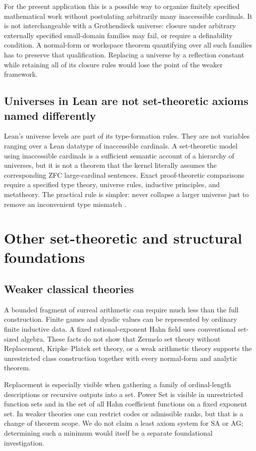 \documentclass[11pt,letterpaper]{article}
\theoremstyle{definition}
\theoremstyle{remark}
\numberwithin{equation}{section}
\begin{document}
For the present application this is a possible way to organize finitely specified mathematical work without postulating arbitrarily many inaccessible cardinals. It is not interchangeable with a Grothendieck universe: closure under arbitrary externally specified small-domain families may fail, or require a definability condition. A normal-form or workspace theorem quantifying over all such families has to preserve that qualification. Replacing a universe by a reflection constant while retaining all of its closure rules would lose the point of the weaker framework.

\subsection{Universes in Lean are not set-theoretic axioms named differently}
Lean's universe levels are part of its type-formation rules. They are not variables ranging over a Lean datatype of inaccessible cardinals. A set-theoretic model using inaccessible cardinals is a sufficient semantic account of a hierarchy of universes, but it is not a theorem that the kernel literally assumes the corresponding ZFC large-cardinal sentences. Exact proof-theoretic comparisons require a specified type theory, universe rules, inductive principles, and metatheory. The practical rule is simpler: never collapse a larger universe just to remove an inconvenient type mismatch \cite{LeanUniverses}.

\section{Other set-theoretic and structural foundations}\label{sec:alternatives}

\subsection{Weaker classical theories}
A bounded fragment of surreal arithmetic can require much less than the full construction. Finite games and dyadic values can be represented by ordinary finite inductive data. A fixed rational-exponent Hahn field uses conventional set-sized algebra. These facts do not show that Zermelo set theory without Replacement, Kripke--Platek set theory, or a weak arithmetic theory supports the unrestricted class construction together with every normal-form and analytic theorem.

Replacement is especially visible when gathering a family of ordinal-length descriptions or recursive outputs into a set. Power Set is visible in unrestricted function sets and in the set of all Hahn coefficient functions on a fixed exponent set. In weaker theories one can restrict codes or admissible ranks, but that is a change of theorem scope. We do not claim a least axiom system for SA or AG; determining such a minimum would itself be a separate foundational investigation.
\end{document}

